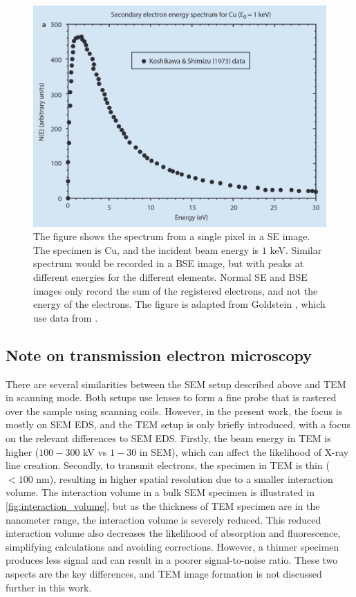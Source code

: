 \begin{figure}[ht]
    \centering
    \includegraphics[width=0.8\linewidth]{figures/SEM_SE_spectrums.png}
    \caption{
        The figure shows the spectrum from a single pixel in a SE image.
        The specimen is Cu, and the incident beam energy is $1$ keV.
        Similar spectrum would be recorded in a BSE image, but with peaks at different energies for the different elements.
        Normal SE and BSE images only record the sum of the registered electrons, and not the energy of the electrons.
        The figure is adapted from Goldstein \cite[Fig. 3.1 a]{goldstein_scanning_2018}, which use data from \cite{koshikawa_SE_spectrum_1973}.
    }
    \label{fig:SEM_SE_spectrums}
\end{figure}





\subsection{Note on transmission electron microscopy}
\label{theory:sem:tem}

There are several similarities between the SEM setup described above and TEM in scanning mode.
Both setups use lenses to form a fine probe that is rastered over the sample using scanning coils.
However, in the present work, the focus is mostly on SEM EDS, and the TEM setup is only briefly introduced, with a focus on the relevant differences to SEM EDS.
Firstly, the beam energy in TEM is higher ($100-300$ kV vs $1-30$ in SEM), which can affect the likelihood of X-ray line creation.
Secondly, to transmit electrons, the specimen in TEM is thin ($<100$ nm), resulting in higher spatial resolution due to a smaller interaction volume.
The interaction volume in a bulk SEM specimen is illustrated in \cref{fig:interaction_volume}, but as the thickness of TEM specimen are in the nanometer range, the interaction volume is severely reduced.
This reduced interaction volume also decreases the likelihood of absorption and fluorescence, simplifying calculations and avoiding corrections.
However, a thinner specimen produces less signal and can result in a poorer signal-to-noise ratio.
These two aspects are the key differences, and TEM image formation is not discussed further in this work.



